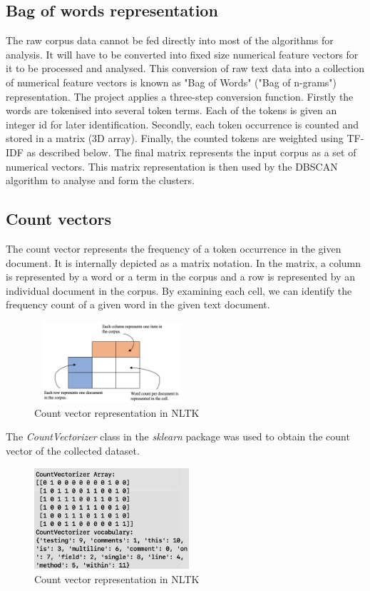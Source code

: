 \documentclass[conference]{IEEEtran}
\begin{document}
\subsection{Bag of words representation}

The raw corpus data cannot be fed directly into most of the algorithms for analysis. It will have to be converted into fixed size numerical feature vectors for it to be processed and analysed. This conversion of raw text data into a collection of numerical feature vectors is known as "Bag of Words" ("Bag of n-grams") representation. The project applies a three-step conversion function. Firstly the words are tokenised into several token terms. Each of the tokens is given an integer id for later identification. Secondly, each token occurrence is counted and stored in a matrix (3D array). Finally, the counted tokens are weighted using TF-IDF as described below. The final matrix represents the input corpus as a set of numerical vectors. This matrix representation is then used by the DBSCAN algorithm to analyse and form the clusters. \cite{scikit-learn}

\subsection{Count vectors}

The count vector represents the frequency of a token occurrence in the given document. It is internally depicted as a matrix notation. In the matrix, a column is represented by a word or a term in the corpus and a row is represented by an individual document in the corpus. By examining each cell, we can identify the frequency count of a given word in the given text document.

\begin{figure}[!h]
\centerline{\includegraphics[width=5.75cm, height=3cm]{graphics/pic-1.png}}
\caption{Count vector representation in NLTK}
\label{fig}
\end{figure}
 
The \textit{CountVectorizer} class in the \textit{sklearn} package was used to obtain the count vector of the collected dataset.

\begin{figure}[!h]
\centerline{\includegraphics[width=5.75cm, height=3.75cm]{graphics/count-vec.png}}
\caption{Count vector representation in NLTK}
\label{fig}
\end{figure}
\end{document}
